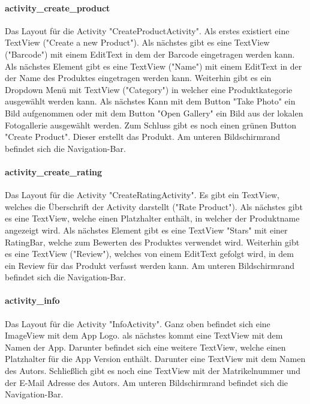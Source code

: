 \documentclass{scrartcl}
\begin{document}
\paragraph{activity\_create\_product} \mbox{} 

\noindent Das Layout für die Activity "CreateProductActivity". Als erstes existiert eine TextView ("Create a new Product"). Als nächstes gibt es eine TextView ("Barcode") mit einem EditText in dem der Barcode eingetragen werden kann. Als nächstes Element gibt es eine TextView ("Name") mit einem EditText in der der Name des Produktes eingetragen werden kann. Weiterhin gibt es ein Dropdown Menü mit TextView ("Category") in welcher eine Produktkategorie ausgewählt werden kann. Als nächstes Kann mit dem Button "Take Photo" ein Bild aufgenommen oder mit dem Button "Open Gallery" ein Bild aus der lokalen Fotogallerie ausgewählt werden. Zum Schluss gibt es noch einen grünen Button "Create Product". Dieser erstellt das Produkt. Am unteren Bildschirmrand befindet sich die Navigation-Bar. 

\paragraph{activity\_create\_rating} \mbox{} 

\noindent Das Layout für die Activity "CreateRatingActivity". Es gibt ein TextView, welches die Überschrift der Activity darstellt ("Rate Product"). Als nächstes gibt es eine TextView, welche einen Platzhalter enthält, in welcher der Produktname angezeigt wird. Als nächstes Element gibt es eine TextView "Stars" mit einer RatingBar, welche zum Bewerten des Produktes verwendet wird. Weiterhin gibt es eine TextView ("Review"), welches von einem EditText gefolgt wird, in dem ein Review für das Produkt verfasst werden kann. Am unteren Bildschirmrand befindet sich die Navigation-Bar.

\paragraph{activity\_info} \mbox{} 

\noindent Das Layout für die Activity "InfoActivity". Ganz oben befindet sich eine ImageView mit dem App Logo. als nächstes kommt eine TextView mit dem Namen der App. Darunter befindet sich eine weitere TextView, welche einen Platzhalter für die App Version enthält. Darunter eine TextView mit dem Namen des Autors. Schließlich gibt es noch eine TextView mit der Matrikelnummer und der E-Mail Adresse des Autors. Am unteren Bildschirmrand befindet sich die Navigation-Bar.
\end{document}
